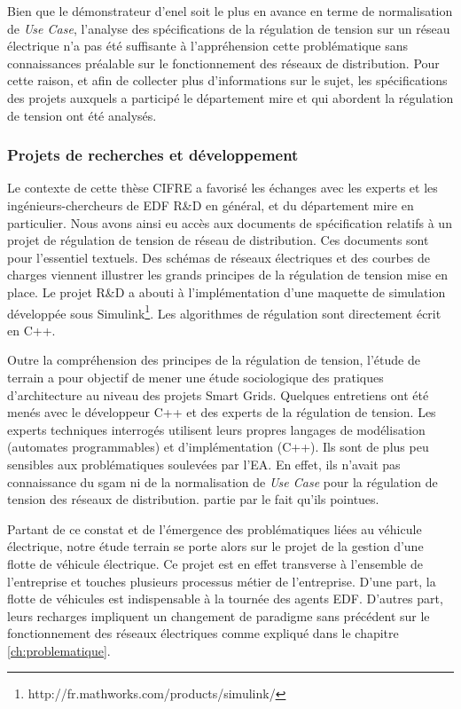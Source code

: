 Bien que le démonstrateur d'\gls{enel} soit le plus en avance en terme de
normalisation de \textit{Use Case}, l'analyse des spécifications de la
régulation de tension sur un réseau électrique n'a pas été suffisante à
l'appréhension cette problématique sans connaissances préalable sur le
fonctionnement des réseaux de distribution. Pour cette raison, et afin de
collecter plus d'informations sur le sujet, les spécifications des projets
auxquels a participé le département \gls{mire} et qui abordent la régulation de
tension ont été analysés.


\subsubsection{Projets de recherches et développement}

Le contexte de cette thèse CIFRE a favorisé les échanges avec les experts et les
ingénieurs-chercheurs de EDF R\&D en général, et du département \gls{mire} en
particulier. Nous avons ainsi eu accès aux documents de spécification relatifs à
un projet de régulation de tension de réseau de distribution. Ces documents sont
pour l'essentiel textuels. Des schémas de réseaux électriques et des courbes de
charges viennent illustrer les grands principes de la régulation de tension
mise en place. Le projet R\&D a abouti à l'implémentation d'une maquette de
simulation développée sous
Simulink\footnote{http://fr.mathworks.com/products/simulink/}. Les algorithmes
de régulation sont directement écrit en C++.

Outre la compréhension des principes de la régulation de tension, l'étude de
terrain a pour objectif de mener une étude sociologique des pratiques
d'architecture au niveau des projets Smart Grids. Quelques entretiens ont été
menés avec le développeur C++ et des experts de la régulation de tension. Les
experts techniques interrogés utilisent leurs propres langages de modélisation
(automates programmables) et d'implémentation (C++). Ils sont de plus peu
sensibles aux problématiques soulevées par l'EA. En effet, ils n'avait pas
connaissance du \gls{sgam} ni de la normalisation de \textit{Use Case} pour la
régulation de tension des réseaux de distribution. %
partie par le fait qu'ils %
pointues.

Partant de ce constat et de l'émergence des problématiques liées au véhicule
électrique, notre étude terrain se porte alors sur le projet de la gestion
d'une flotte de véhicule électrique. Ce projet est en effet transverse à
l'ensemble de l'entreprise et touches plusieurs processus métier de
l'entreprise. D'une part, la flotte de véhicules est indispensable à la tournée
des agents EDF. D'autres part, leurs recharges impliquent un changement de
paradigme sans précédent sur le fonctionnement des réseaux électriques comme
expliqué dans le chapitre \ref{ch:problematique}.

